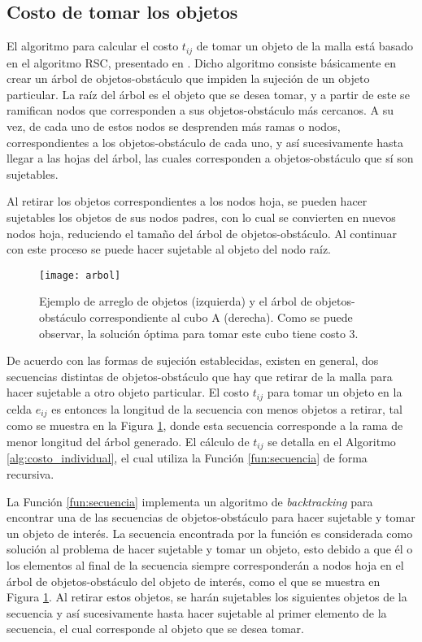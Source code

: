 \vspace{-\belowdisplayskip}%
%
%
\subsection{Costo de tomar los objetos}
\label{subsec:costo}
%
%
El algoritmo para calcular el costo $t_{ij}$ de tomar un objeto de la malla está basado en el algoritmo RSC, presentado en \cite{4209604}.
Dicho algoritmo consiste básicamente en crear un árbol de objetos-obstáculo que impiden la sujeción de un objeto particular.
La raíz del árbol es el objeto que se desea tomar, y a partir de este se ramifican nodos que corresponden a sus objetos-obstáculo más cercanos.
A su vez, de cada uno de estos nodos se desprenden más ramas o nodos, correspondientes a los objetos-obstáculo de cada uno, y así sucesivamente hasta llegar a las hojas del árbol, las cuales corresponden a objetos-obstáculo que sí son sujetables.

Al retirar los objetos correspondientes a los nodos hoja, se pueden hacer sujetables los objetos de sus nodos padres, con lo cual se convierten en nuevos nodos hoja, reduciendo el tamaño del árbol de objetos-obstáculo.
Al continuar con este proceso se puede hacer sujetable al objeto del nodo raíz.
%
\begin{figure}[H]
	\texttt{[image: arbol]}%
	\caption{Ejemplo de arreglo de objetos (izquierda) y el árbol de objetos-obstáculo correspondiente al cubo A (derecha). Como se puede observar, la solución óptima para tomar este cubo tiene costo 3.}%
	\label{fig:arbol}%
\end{figure}
%
De acuerdo con las formas de sujeción establecidas, existen en general, dos secuencias distintas de objetos-obstáculo que hay que retirar de la malla para hacer sujetable a otro objeto particular.
El costo $t_{ij}$ para tomar un objeto en la celda $e_{ij}$ es entonces la longitud de la secuencia con menos objetos a retirar, tal como se muestra en la Figura \ref{fig:arbol}, donde esta secuencia corresponde a la rama de menor longitud del árbol generado.
El cálculo de $t_{ij}$ se detalla en el Algoritmo \ref{alg:costo_individual}, el cual utiliza la Función \ref{fun:secuencia} de forma recursiva.

La Función \ref{fun:secuencia} implementa un algoritmo de \textit{backtracking} para encontrar una de las secuencias de objetos-obstáculo para hacer sujetable y tomar un objeto de interés.
La secuencia encontrada por la función es considerada como solución al problema de hacer sujetable y tomar un objeto, esto debido a que él o los elementos al final de la secuencia siempre corresponderán a nodos hoja en el árbol de objetos-obstáculo del objeto de interés, como el que se muestra en Figura \ref{fig:arbol}.
Al retirar estos objetos, se harán sujetables los siguientes objetos de la secuencia y así sucesivamente hasta hacer sujetable al primer elemento de la secuencia, el cual corresponde al objeto que se desea tomar.

